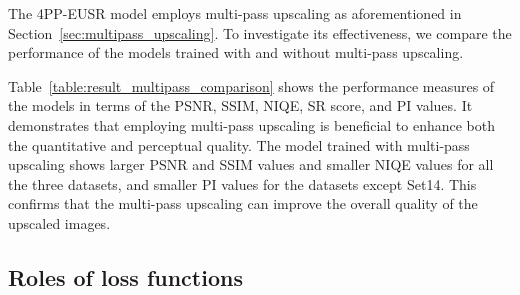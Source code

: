 \documentclass[runningheads]{llncs}
\begin{document}
The 4PP-EUSR model employs multi-pass upscaling as aforementioned in Section~\ref{sec:multipass_upscaling}.
To investigate its effectiveness, we compare the performance of the models trained with and without multi-pass upscaling.

Table~\ref{table:result_multipass_comparison} shows the performance measures of the models in terms of the PSNR, SSIM, NIQE, SR score, and PI values.
It demonstrates that employing multi-pass upscaling is beneficial to enhance both the quantitative and perceptual quality.
The model trained with multi-pass upscaling shows larger PSNR and SSIM values and smaller NIQE values for all the three datasets, and smaller PI values for the datasets except Set14.
This confirms that the multi-pass upscaling can improve the overall quality of the upscaled images.


\subsection{Roles of loss functions}
\label{sec:roles_of_loss_functions}
\end{document}
